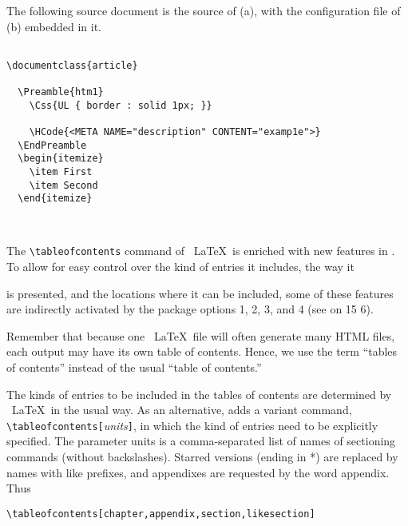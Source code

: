The following source document is the source of (a), with the
configuration file of (b) embedded in it. 

\begin{lstlisting}

\documentclass{article} 
   
  \Preamble{htm1} 
    \Css{UL { border : solid 1px; }} 
 
    \HCode{<META NAME="description" CONTENT="examp1e">} 
  \EndPreamble 
  \begin{itemize} 
    \item First 
    \item Second 
  \end{itemize} 

 

\end{lstlisting}

The \verb|\tableofcontents| command of \ \LaTeX\  is enriched with new
features in \texht. To allow for easy control over the kind of entries
it includes, the way it 
 
 
is presented, and the locations where it can be included, some of these
features are indirectly activated by the package options 1, 2, 3, and 4
(see  on 15 6). 

Remember that because one \ \LaTeX\  file will often generate many HTML
files, each output may have its own table of contents. Hence, we use the
term ``tables of contents'' instead of the usual ``table of contents.''


The kinds of entries to be included in the tables of contents are
determined by \ \LaTeX\  in the usual way. As an alternative, \texht adds a
variant command, \verb|\tableofcontents[|\emph{units}\verb|]|, in which
the kind of entries need to be explicitly specified. The parameter units
is a comma-separated list of names of sectioning commands (without
backslashes). Starred versions (ending in *) are replaced by names with
like prefixes, and appendixes are requested by the word appendix. Thus 

\begin{verbatim}
\tableofcontents[chapter,appendix,section,likesection] 
\end{verbatim}

